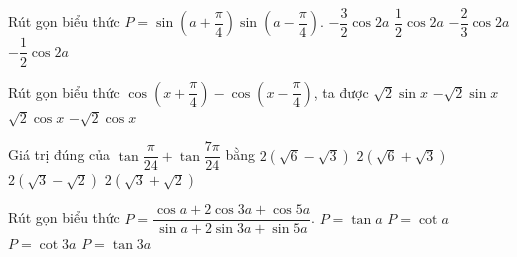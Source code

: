 \begin{ex}%
	Rút gọn biểu  thức $P=\sin \left(a+\dfrac {\pi }{4} \right)\sin \left( a-\dfrac {\pi }{4} \right)$.
	 \choice
		{$-\dfrac {3}{2}\cos  2a$}
		{$\dfrac {1}{2}\cos 2a$} 
		{$-\dfrac  {2}{3}\cos 2a$}
		{\True  $-\dfrac {1}{2}\cos 2a$}
\end{ex}

\begin{ex}%
	Rút gọn biểu thức $\cos \left(x + \dfrac{\pi}{4}\right)  - \cos \left(x - \dfrac{\pi}{4}\right)$, ta được
	\choice 
		{$\sqrt{2}  \sin x$}
		 {\True $-\sqrt{2} \sin x$}
		{$\sqrt{2}  \cos x$}
		{$-\sqrt{2} \cos  x$}
\end{ex}

\begin{ex}%
	Giá trị đúng của $\tan \dfrac  {\pi }{24}+\tan \dfrac {7\pi }{24}$ bằng
	 \choice
		 {\True $2\left( \sqrt {6}-\sqrt {3} \right)$}
		{$2\left(\sqrt {6}+\sqrt {3} \right)$} 
		{$2\left(\sqrt {3}-\sqrt  {2} \right)$}
		 {$2\left(\sqrt {3}+\sqrt {2} \right)$}
\end{ex}

\begin{ex}%
	Rút gọn biểu thức $P=\dfrac {\cos a+2\cos 3a+\cos 5a}{\sin a+2\sin  3a+\sin 5a}$.
	 \choice
		{$P=\tan a$} 
		{$P=\cot  a$}
		{\True  $P=\cot 3a$}
		 {$P=\tan 3a$}
\end{ex}

